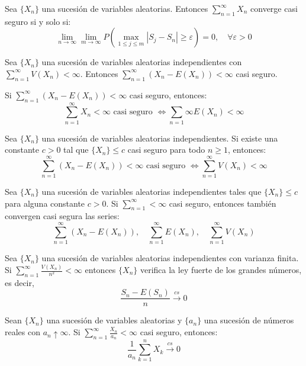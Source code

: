 \begin{lemma}
    Sea $\{X_n\}$ una sucesión de variables aleatorias.
    Entonces $\sum_{n=1}^\infty X_n$ converge casi seguro si y solo si:
    $$\lim\limits_{n \to \infty} \lim\limits_{m \to \infty} P(\max_{1 \leq j \leq m} |S_j - S_n| \geq \varepsilon) = 0, \quad \forall \varepsilon > 0$$
\end{lemma}

\begin{theorem}
    Sea $\{X_n\}$ una sucesión de variables aleatorias independientes con $\sum_{n=1}^\infty V(X_n) < \infty$.
    Entonces $\sum_{n=1}^\infty (X_n - E(X_n)) < \infty$ casi seguro.
\end{theorem}

\begin{remark}
    Si $\sum_{n=1}^\infty (X_n - E(X_n)) < \infty$ casi seguro, entonces:
    $$\sum_{n=1}^\infty X_n < \infty \text{ casi seguro } \Leftrightarrow \sum_{n=1}\infty E(X_n) < \infty$$
\end{remark}

\begin{theorem}
    Sea $\{X_n\}$ una sucesión de variables aleatorias independientes.
    Si existe una constante $c > 0$ tal que $\{X_n\} \leq c$ casi seguro para todo $n \geq 1$, entonces:
    $$\sum_{n=1}^\infty (X_n - E(X_n)) < \infty \text{ casi seguro } \Leftrightarrow \sum_{n=1}^\infty V(X_n) < \infty$$
\end{theorem}

\begin{corollary}
    Sea $\{X_n\}$ una sucesión de variables aleatorias independientes tales que $\{X_n\} \leq c$ para alguna constante $c > 0$.
    Si $\sum_{n=1}^\infty < \infty$ casi seguro, entonces también convergen casi segura las series:
    $$\sum_{n=1}^\infty (X_n - E(X_n)), \quad \sum_{n=1}^\infty E(X_n), \quad \sum_{n=1}^\infty V(X_n)$$
\end{corollary}

\begin{theorem}
    Sea $\{X_n\}$ una sucesión de variables aleatorias independientes con varianza finita.
    Si $\sum_{n=1}^\infty \frac{V(X_n)}{n^2} < \infty$ entonces $\{X_n\}$ verifica la ley fuerte de los grandes números, es decir,
    $$\frac{S_n - E(S_n)}{n} \xrightarrow{cs} 0$$
\end{theorem}

\begin{lemma}[Kronecker]
    Sean $\{X_n\}$ una sucesión de variables aleatorias y $\{a_n\}$ una sucesión de números reales con $a_n \uparrow \infty$.
    Si $\sum_{n=1}^\infty \frac{X_n}{a_n} < \infty$ casi seguro, entonces:
    $$\frac{1}{a_n} \sum_{k=1}^n X_k \xrightarrow{cs} 0$$
\end{lemma}

